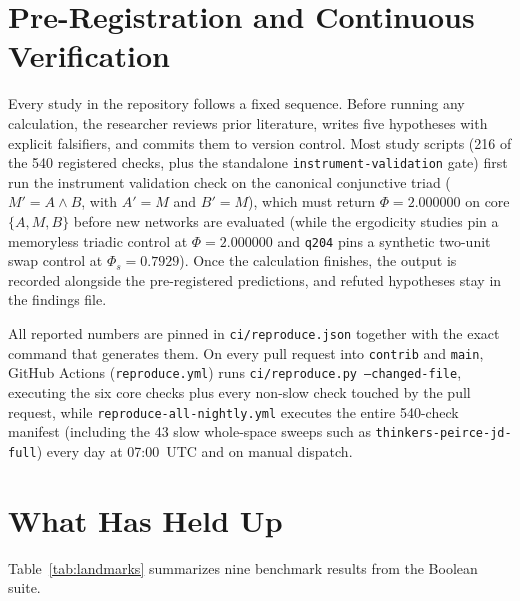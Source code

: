 \documentclass[11pt,a4paper]{article}
\begin{document}
\section{Pre-Registration and Continuous Verification}

Every study in the repository follows a fixed sequence. Before running any calculation, the researcher reviews prior literature, writes five hypotheses with explicit falsifiers, and commits them to version control. Most study scripts (216 of the 540 registered checks, plus the standalone \texttt{instrument-validation} gate) first run the instrument validation check on the canonical conjunctive triad ($M' = A \wedge B$, with $A' = M$ and $B' = M$), which must return $\Phi = 2.000000$ on core $\{A, M, B\}$ before new networks are evaluated (while the ergodicity studies pin a memoryless triadic control at $\Phi = 2.000000$ and \texttt{q204} pins a synthetic two-unit swap control at $\Phi_s = 0.7929$). Once the calculation finishes, the output is recorded alongside the pre-registered predictions, and refuted hypotheses stay in the findings file.

All reported numbers are pinned in \texttt{ci/reproduce.json} together with the exact command that generates them. On every pull request into \texttt{contrib} and \texttt{main}, GitHub Actions (\texttt{reproduce.yml}) runs \texttt{ci/reproduce.py --changed-file}, executing the six core checks plus every non-slow check touched by the pull request, while \texttt{reproduce-all-nightly.yml} executes the entire 540-check manifest (including the 43 slow whole-space sweeps such as \texttt{thinkers-peirce-jd-full}) every day at 07:00~UTC and on manual dispatch.

\section{What Has Held Up}

Table~\ref{tab:landmarks} summarizes nine benchmark results from the Boolean suite.
\end{document}
